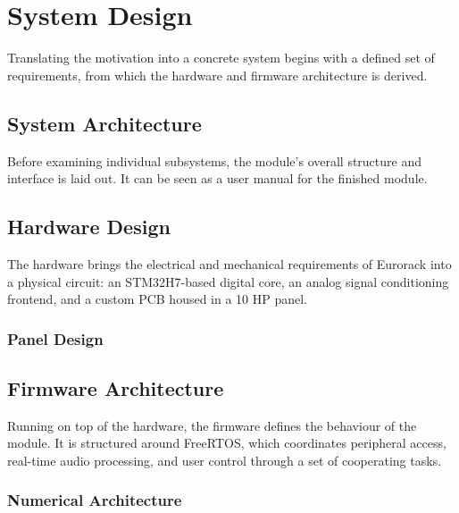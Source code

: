 \documentclass{article}
\begin{document}
\newpage
\section{System Design}
Translating the motivation into a concrete system begins with a defined set of requirements, from which the hardware and firmware architecture is derived.
    
	
	\newpage
	\subsection{System Architecture}
	Before examining individual subsystems, the module's overall structure and interface is laid out.
	It can be seen as a user manual for the finished module.
	
	


	\newpage
	\subsection{Hardware Design}
	The hardware brings the electrical and mechanical requirements of Eurorack into a physical circuit: an STM32H7-based digital core, an analog signal conditioning frontend, and a custom PCB housed in a 10 HP panel.
        

		
		
		
	
		
			
		\newpage
		\subsubsection{Panel Design}
		

	\newpage
	\subsection{Firmware Architecture}
	Running on top of the hardware, the firmware defines the behaviour of the module. It is structured around FreeRTOS, which coordinates peripheral access, real-time audio processing, and user control through a set of cooperating tasks.
	

		\subsubsection{Numerical Architecture}
		\label{sec:numerical-architecture}
		
		
\end{document}
